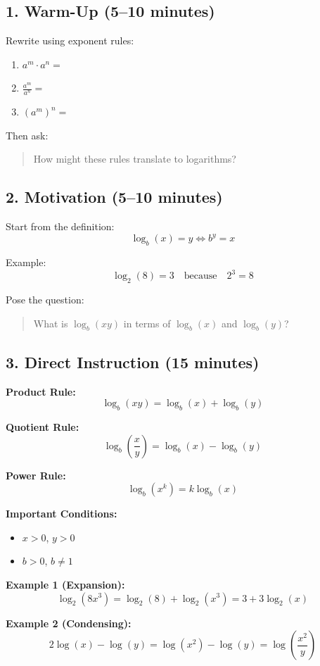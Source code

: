 \documentclass[10pt]{article}
\begin{document}
\subsection*{1. Warm-Up (5--10 minutes)}

Rewrite using exponent rules:
\begin{enumerate}[label=\arabic*.]
    \item $a^m \cdot a^n =$
    \item $\frac{a^m}{a^n} =$
    \item $(a^m)^n =$
\end{enumerate}

Then ask:
\begin{quote}
How might these rules translate to logarithms?
\end{quote}

\subsection*{2. Motivation (5--10 minutes)}

Start from the definition:
\[
\log_b(x) = y \iff b^y = x
\]

Example:
\[
\log_2(8) = 3 \quad \text{because} \quad 2^3 = 8
\]

Pose the question:
\begin{quote}
What is $\log_b(xy)$ in terms of $\log_b(x)$ and $\log_b(y)$?
\end{quote}

\subsection*{3. Direct Instruction (15 minutes)}

\textbf{Product Rule:}
\[
\log_b(xy) = \log_b(x) + \log_b(y)
\]

\textbf{Quotient Rule:}
\[
\log_b\left(\frac{x}{y}\right) = \log_b(x) - \log_b(y)
\]

\textbf{Power Rule:}
\[
\log_b(x^k) = k \log_b(x)
\]

\textbf{Important Conditions:}
\begin{itemize}
    \item $x > 0$, $y > 0$
    \item $b > 0$, $b \neq 1$
\end{itemize}

\textbf{Example 1 (Expansion):}
\[
\log_2(8x^3) = \log_2(8) + \log_2(x^3) = 3 + 3\log_2(x)
\]

\textbf{Example 2 (Condensing):}
\[
2\log(x) - \log(y) = \log(x^2) - \log(y) = \log\left(\frac{x^2}{y}\right)
\]
\end{document}
